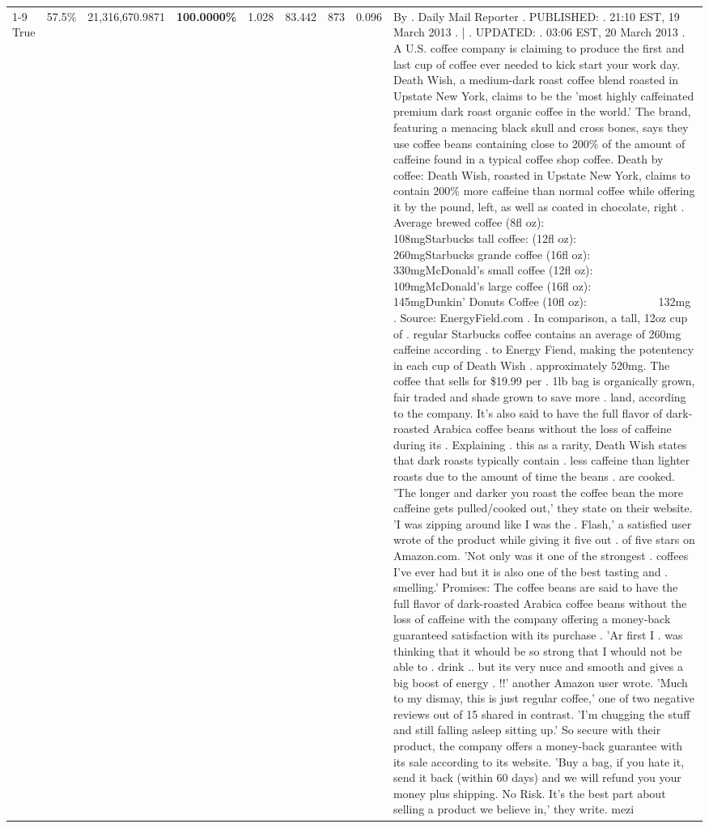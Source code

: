 \begin{table}[H]
{\begin{tabular}{lllrlllll}
\cline{1-9} \cline{2-9}
True & 57.5\% & 21,316,670.9871 & \bfseries \color{red} 100.0000\% & 1.028 & 83.442 & 873 & 0.096 & By . Daily Mail Reporter . PUBLISHED: . 21:10 EST, 19 March 2013 . | . UPDATED: . 03:06 EST, 20 March 2013 . A U.S. coffee company is claiming to produce the first and last cup of coffee ever needed to kick start your work day. Death Wish, a medium-dark roast coffee blend roasted in Upstate New York, claims to be the 'most highly caffeinated premium dark roast organic coffee in the world.' The brand, featuring a menacing black skull and cross bones, says they use coffee beans containing close to 200\% of the amount of caffeine found in a typical coffee shop coffee. Death by coffee: Death Wish, roasted in Upstate New York, claims to contain 200\% more caffeine than normal coffee while offering it by the pound, left, as well as coated in chocolate, right . Average brewed coffee (8fl oz):              108mgStarbucks tall coffee: (12fl oz):                260mgStarbucks grande coffee (16fl oz):         330mgMcDonald's small coffee (12fl oz):           109mgMcDonald's large coffee (16fl oz):           145mgDunkin' Donuts Coffee (10fl oz):             132mg . Source: EnergyField.com . In comparison, a tall, 12oz cup of . regular Starbucks coffee contains an average of 260mg caffeine according . to Energy Fiend, making the potentency in each cup of Death Wish . approximately 520mg. The coffee that sells for \$19.99 per . 1lb bag is organically grown, fair traded and shade grown to save more . land, according to the company. It's also said to have the full flavor of dark-roasted Arabica coffee beans without the loss of caffeine during its . Explaining . this as a rarity, Death Wish states that dark roasts typically contain . less caffeine than lighter roasts due to the amount of time the beans . are cooked. 'The longer and darker you roast the coffee bean the more caffeine gets pulled/cooked out,' they state on their website. 'I was zipping around like I was the . Flash,' a satisfied user wrote of the product while giving it five out . of five stars on Amazon.com. 'Not only was it one of the strongest . coffees I've ever had but it is also one of the best tasting and . smelling.’ Promises: The coffee beans are said to have the full flavor of dark-roasted Arabica coffee beans without the loss of caffeine with the company offering a money-back guaranteed satisfaction with its purchase . 'Ar first I . was thinking that it whould be so strong that I whould not be able to . drink .. but its very nuce and smooth and gives a big boost of energy . !!' another Amazon user wrote. 'Much to my dismay, this is just regular coffee,' one of two negative reviews out of 15 shared in contrast. 'I'm chugging the stuff and still falling asleep sitting up.' So secure with their product, the company offers a money-back guarantee with its sale according to its website. 'Buy a bag, if you hate it, send it back (within 60 days) and we will refund you your money plus shipping. No Risk. It’s the best part about selling a product we believe in,' they write. mezi \\

\end{tabular}}
\end{table}
